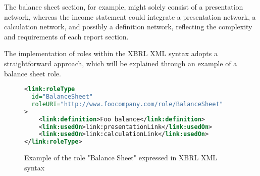 The balance sheet section, for example, might solely consist of a presentation network, whereas the income statement could integrate a presentation network, 
a calculation network, and possibly a definition network, reflecting the complexity and requirements of each report section.

The implementation of roles within the XBRL XML syntax adopts a straightforward approach, 
which will be explained through an example of a balance sheet role.

\begin{figure}[H]
    \caption{Example of the role "Balance Sheet" expressed in XBRL XML syntax\cite{xbrl21_custom_roles}}
    \label{fig:example_role_xbrl}
    \begin{lstlisting}[language=XML,basicstyle=\small\ttfamily]
<link:roleType 
  id="BalanceSheet" 
  roleURI="http://www.foocompany.com/role/BalanceSheet"
>
    <link:definition>Foo balance</link:definition>
    <link:usedOn>link:presentationLink</link:usedOn>
    <link:usedOn>link:calculationLink</link:usedOn>
</link:roleType>
\end{lstlisting}
\end{figure}





